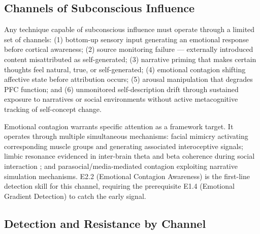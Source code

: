 \documentclass[12pt, a4paper]{article}
\begin{document}
\subsection{Channels of Subconscious Influence}

Any technique capable of subconscious influence must operate through a limited set
of channels: (1) bottom-up sensory input generating an emotional response before
cortical awareness; (2) source monitoring failure --- externally introduced content
misattributed as self-generated; (3) narrative priming that makes certain thoughts
feel natural, true, or self-generated; (4) emotional contagion shifting affective
state before attribution occurs; (5) arousal manipulation that degrades PFC function;
and (6) unmonitored self-description drift through sustained exposure to narratives
or social environments without active metacognitive tracking of self-concept change.

Emotional contagion warrants specific attention as a framework target. It operates
through multiple simultaneous mechanisms: facial mimicry activating corresponding
muscle groups and generating associated interoceptive signals; limbic resonance
evidenced in inter-brain theta and beta coherence during social interaction
\citep{chen2022}; and parasocial/media-mediated contagion exploiting narrative
simulation mechanisms. E2.2 (Emotional Contagion Awareness) is the first-line
detection skill for this channel, requiring the prerequisite E1.4 (Emotional
Gradient Detection) to catch the early signal.

\subsection{Detection and Resistance by Channel}
\end{document}
